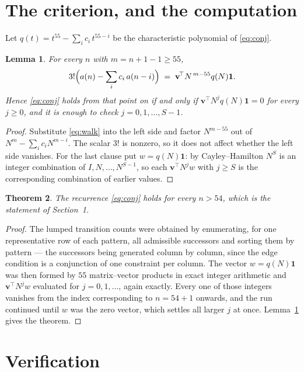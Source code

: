 \documentclass[11pt,a4paper]{article}
\theoremstyle{plain}
\newtheorem{theorem}{Theorem}
\newtheorem{lemma}[theorem]{Lemma}
\theoremstyle{definition}
\begin{document}
\section{The criterion, and the computation}

Let $q(t)=t^{55}-\sum_i c_i\,t^{55-i}$ be the characteristic polynomial of
\eqref{eq:conj}.

\begin{lemma}\label{lem:crit}
For every $n$ with $m=n+1-1\ge55$,
\[
3!\Bigl(a(n)-\sum_i c_i\,a(n-i)\Bigr)\;=\;\mathbf{v}^{\!\top}N^{\,m-55}q(N)\mathbf{1} .
\]
Hence \eqref{eq:conj} holds from that point on if and only if
$\mathbf{v}^{\!\top}N^{j}q(N)\mathbf{1}=0$ for every $j\ge0$, and it is enough to check
$j=0,1,\dots,S-1$.
\end{lemma}

\begin{proof}
Substitute \eqref{eq:walk} into the left side and factor $N^{m-55}$ out of
$N^{m}-\sum_i c_iN^{m-i}$. The scalar $3!$ is nonzero, so it does not affect whether
the left side vanishes. For the last clause put $w=q(N)\mathbf{1}$: by Cayley--Hamilton
$N^{S}$ is an integer combination of $I,N,\dots,N^{S-1}$, so each
$\mathbf{v}^{\!\top}N^{j}w$ with $j\ge S$ is the corresponding combination of earlier
values.
\end{proof}

\begin{theorem}
The recurrence \eqref{eq:conj} holds for every $n>54$, which is the statement of
Section~1.
\end{theorem}

\begin{proof}
The lumped transition counts were obtained by enumerating, for one representative row of
each pattern, all admissible successors and sorting them by pattern --- the successors being
generated column by column, since the edge condition is a conjunction of one constraint per
column. The vector $w=q(N)\mathbf{1}$ was then formed by $55$ matrix--vector products
in exact integer arithmetic and $\mathbf{v}^{\!\top}N^{j}w$ evaluated for
$j=0,1,\dots$, again exactly. Every one of those integers vanishes from the index
corresponding to $n=54+1$ onwards, and the run continued until $w$ was the zero vector,
which settles all larger $j$ at once. Lemma~\ref{lem:crit} gives the theorem.
\end{proof}

\section{Verification}
\end{document}
